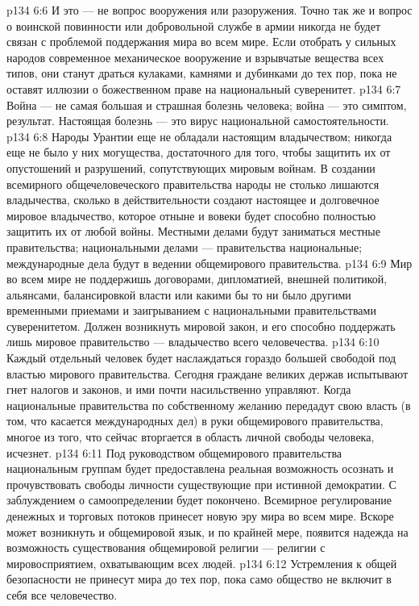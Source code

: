 \vs p134 6:6 И это --- не вопрос вооружения или разоружения. Точно так же и вопрос о воинской повинности или добровольной службе в армии никогда не будет связан с проблемой поддержания мира во всем мире. Если отобрать у сильных народов современное механическое вооружение и взрывчатые вещества всех типов, они станут драться кулаками, камнями и дубинками до тех пор, пока не оставят иллюзии о божественном праве на национальный суверенитет.
\vs p134 6:7 Война --- не самая большая и страшная болезнь человека; война --- это симптом, результат. Настоящая болезнь --- это вирус национальной самостоятельности.
\vs p134 6:8 Народы Урантии еще не обладали настоящим владычеством; никогда еще не было у них могущества, достаточного для того, чтобы защитить их от опустошений и разрушений, сопутствующих мировым войнам. В создании всемирного общечеловеческого правительства народы не столько лишаются владычества, сколько в действительности создают настоящее и долговечное мировое владычество, которое отныне и вовеки будет способно полностью защитить их от любой войны. Местными делами будут заниматься местные правительства; национальными делами --- правительства национальные; международные дела будут в ведении общемирового правительства.
\vs p134 6:9 Мир во всем мире не поддержишь договорами, дипломатией, внешней политикой, альянсами, балансировкой власти или какими бы то ни было другими временными приемами и заигрыванием с национальными правительствами суверенитетом. Должен возникнуть мировой закон, и его способно поддержать лишь мировое правительство --- владычество всего человечества.
\vs p134 6:10 Каждый отдельный человек будет наслаждаться гораздо большей свободой под властью мирового правительства. Сегодня граждане великих держав испытывают гнет налогов и законов, и ими почти насильственно управляют. Когда национальные правительства по собственному желанию передадут свою власть (в том, что касается международных дел) в руки общемирового правительства, многое из того, что сейчас вторгается в область личной свободы человека, исчезнет.
\vs p134 6:11 Под руководством общемирового правительства национальным группам будет предоставлена реальная возможность осознать и прочувствовать свободы личности существующие при истинной демократии. С заблуждением о самоопределении будет покончено. Всемирное регулирование денежных и торговых потоков принесет новую эру мира во всем мире. Вскоре может возникнуть и общемировой язык, и по крайней мере, появится надежда на возможность существования общемировой религии --- религии с мировосприятием, охватывающим всех людей.
\vs p134 6:12 Устремления к общей безопасности не принесут мира до тех пор, пока само общество не включит в себя все человечество.

